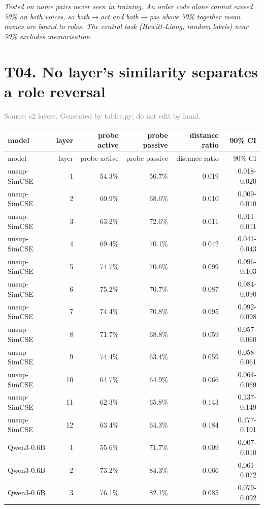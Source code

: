 \documentclass[10pt]{article}
\begin{document}
\textit{Tested on name pairs never seen in training. An order code alone cannot exceed 50\% on both voices, so both$\rightarrow$act and both$\rightarrow$pas above 50\% together mean names are bound to roles. The control task (Hewitt-Liang, random labels) near 50\% excludes memorisation.}
\clearpage

\section*{T04. No layer's similarity separates a role reversal}
\textcolor{gray}{Source: e2 layers. Generated by tables.py; do not edit by hand.}

\footnotesize
\begin{longtable}{lrrrrr}
\toprule
model & layer & probe active & probe passive & distance ratio & 90\% CI \\
\midrule
\endfirsthead
\toprule
model & layer & probe active & probe passive & distance ratio & 90\% CI \\
\midrule
\endhead
\bottomrule
\endfoot
unsup-SimCSE & 1 & 54.3\% & 56.7\% & 0.019 & 0.018-0.020 \\
unsup-SimCSE & 2 & 60.9\% & 68.6\% & 0.010 & 0.009-0.010 \\
unsup-SimCSE & 3 & 63.2\% & 72.6\% & 0.011 & 0.011-0.011 \\
unsup-SimCSE & 4 & 69.4\% & 70.1\% & 0.042 & 0.041-0.043 \\
unsup-SimCSE & 5 & 74.7\% & 70.6\% & 0.099 & 0.096-0.103 \\
unsup-SimCSE & 6 & 75.2\% & 70.7\% & 0.087 & 0.084-0.090 \\
unsup-SimCSE & 7 & 74.4\% & 70.8\% & 0.095 & 0.092-0.098 \\
unsup-SimCSE & 8 & 71.7\% & 68.8\% & 0.059 & 0.057-0.060 \\
unsup-SimCSE & 9 & 74.4\% & 63.4\% & 0.059 & 0.058-0.061 \\
unsup-SimCSE & 10 & 64.7\% & 64.9\% & 0.066 & 0.064-0.069 \\
unsup-SimCSE & 11 & 62.3\% & 65.8\% & 0.143 & 0.137-0.149 \\
unsup-SimCSE & 12 & 63.4\% & 64.3\% & 0.184 & 0.177-0.191 \\
Qwen3-0.6B & 1 & 55.6\% & 71.7\% & 0.009 & 0.007-0.010 \\
Qwen3-0.6B & 2 & 73.2\% & 84.3\% & 0.066 & 0.061-0.072 \\
Qwen3-0.6B & 3 & 76.1\% & 82.1\% & 0.085 & 0.079-0.092 \\

\end{longtable}
\end{document}
